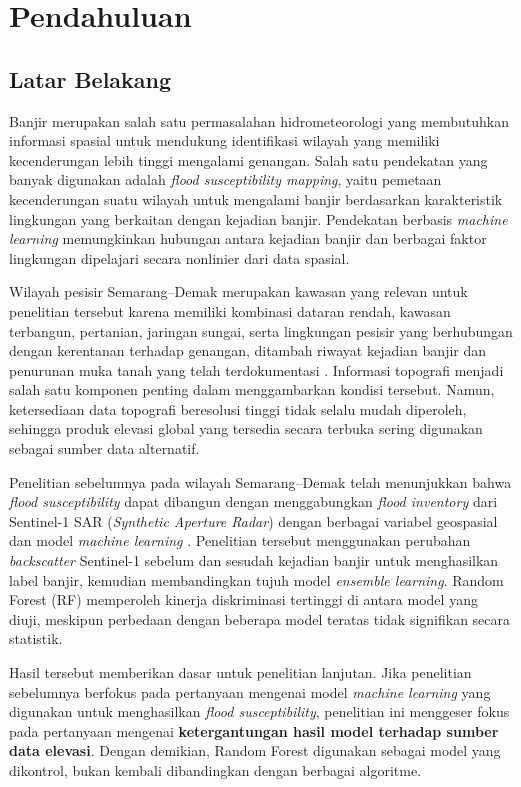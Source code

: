\documentclass[12pt]{article}
\begin{document}
\section{Pendahuluan}

\subsection{Latar Belakang}

Banjir merupakan salah satu permasalahan hidrometeorologi yang membutuhkan
informasi spasial untuk mendukung identifikasi wilayah yang memiliki
kecenderungan lebih tinggi mengalami genangan. Salah satu pendekatan yang
banyak digunakan adalah \textit{flood susceptibility mapping}, yaitu pemetaan
kecenderungan suatu wilayah untuk mengalami banjir berdasarkan karakteristik
lingkungan yang berkaitan dengan kejadian banjir. Pendekatan berbasis
\textit{machine learning} memungkinkan hubungan antara kejadian banjir dan
berbagai faktor lingkungan dipelajari secara nonlinier dari data spasial.

Wilayah pesisir Semarang--Demak merupakan kawasan yang relevan untuk
penelitian tersebut karena memiliki kombinasi dataran rendah, kawasan
terbangun, pertanian, jaringan sungai, serta lingkungan pesisir yang
berhubungan dengan kerentanan terhadap genangan, ditambah riwayat kejadian
banjir dan penurunan muka tanah yang telah terdokumentasi
\cite{marfai2008,abidin2015,Husnayaen2018,Sakina2025}. Informasi topografi
menjadi salah satu komponen penting dalam menggambarkan kondisi tersebut.
Namun, ketersediaan data topografi beresolusi tinggi tidak selalu mudah
diperoleh, sehingga produk elevasi global yang tersedia secara terbuka sering
digunakan sebagai sumber data alternatif.

Penelitian sebelumnya pada wilayah Semarang--Demak telah menunjukkan bahwa
\textit{flood susceptibility} dapat dibangun dengan menggabungkan
\textit{flood inventory} dari Sentinel-1 SAR (\textit{Synthetic Aperture
Radar}) dengan berbagai variabel
geospasial dan model \textit{machine learning} \cite{hakim2026}. Penelitian
tersebut menggunakan perubahan \textit{backscatter} Sentinel-1 sebelum dan
sesudah kejadian banjir untuk menghasilkan label banjir, kemudian membandingkan
tujuh model \textit{ensemble learning}. Random Forest (RF) memperoleh kinerja
diskriminasi tertinggi di antara model yang diuji, meskipun perbedaan dengan
beberapa model teratas tidak signifikan secara statistik.

Hasil tersebut memberikan dasar untuk penelitian lanjutan. Jika penelitian
sebelumnya berfokus pada pertanyaan mengenai model \textit{machine learning}
yang digunakan untuk menghasilkan \textit{flood susceptibility}, penelitian
ini menggeser fokus pada pertanyaan mengenai \textbf{ketergantungan hasil
model terhadap sumber data elevasi}. Dengan demikian, Random Forest digunakan
sebagai model yang dikontrol, bukan kembali dibandingkan dengan berbagai
algoritme.
\end{document}
